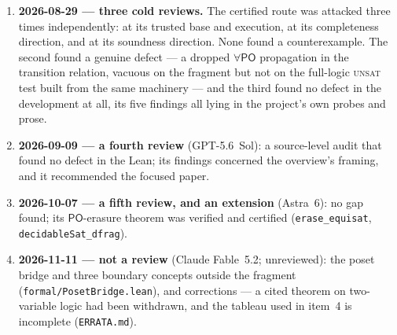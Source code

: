 \documentclass[11pt]{article}
\newcommand{\PO}{\ensuremath{\mathsf{PO}}}
\newcommand{\code}[1]{\texttt{#1}}
\begin{document}
\begin{enumerate}
  What makes the route work is specific to this fragment, and is worth
  stating because it explains the boundary: a composition cell containing
  $\PO$ can always be discharged by putting the pair at $\PO$ unless some
  formula can object to a $\PO$ edge, and the only formula that can is
  $\forall\PO.D$; so here the maximally-$\PO$ unfolding is \emph{always} a
  model, and no joint realizability across a signature's several demands is
  ever needed. This route does \emph{not} use the $K(C_0)$ bound, so
  items~1--3 above remain independent, unformalized arguments for the same
  theorem. Capstones: \code{decidableFSat}, \code{decidableSat\_cone},
  \code{decidableSetSat}. The design document is
  \code{papers/cone\_scheme\_plan/}; the Lean development and its
  section-by-section provenance are \code{formal/POFreeLift.lean} and
  \code{ASSEMBLY\_DESIGN.md} \S\S267--297.
\item \textbf{2026-08-29 --- three cold reviews.} The certified route was
  attacked three times independently: at its trusted base and execution, at
  its completeness direction, and at its soundness direction. None found a
  counterexample. The second found a genuine defect --- a dropped
  $\forall\PO$ propagation in the transition relation, vacuous on the
  fragment but not on the full-logic \textsc{unsat} test built from the same
  machinery --- and the third found no defect in the development at all, its
  five findings all lying in the project's own probes and prose.
\item \textbf{2026-09-09 --- a fourth review} (GPT-5.6~Sol): a source-level
  audit that found no defect in the Lean; its findings concerned the
  overview's framing, and it recommended the focused paper.
\item \textbf{2026-10-07 --- a fifth review, and an extension} (Astra~6): no
  gap found; its $\PO$-erasure theorem was verified and certified
  (\code{erase\_equisat}, \code{decidableSat\_dfrag}).
\item \textbf{2026-11-11 --- not a review} (Claude Fable~5.2; unreviewed): the
  poset bridge and three boundary concepts outside the fragment
  (\code{formal/PosetBridge.lean}), and corrections --- a cited theorem on
  two-variable logic had been withdrawn, and the tableau used in item~4 is
  incomplete (\code{ERRATA.md}).
\end{enumerate}
\end{document}
